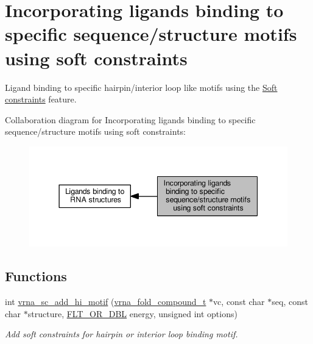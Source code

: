 \hypertarget{group__constraints__ligand}{}\section{Incorporating ligands binding to specific sequence/structure motifs using soft constraints}
\label{group__constraints__ligand}


Ligand binding to specific hairpin/interior loop like motifs using the \hyperlink{group__soft__constraints}{Soft constraints} feature.  


Collaboration diagram for Incorporating ligands binding to specific sequence/structure motifs using soft constraints\+:
\nopagebreak
\begin{figure}[H]
\begin{center}
\leavevmode
\includegraphics[width=344pt]{group__constraints__ligand}
\end{center}
\end{figure}
\subsection*{Functions}
\begin{DoxyCompactItemize}
\item 
int \hyperlink{group__constraints__ligand_gaa6ff0113a3a76dc0b8d62961f4e1dfa0}{vrna\+\_\+sc\+\_\+add\+\_\+hi\+\_\+motif} (\hyperlink{group__fold__compound_ga1b0cef17fd40466cef5968eaeeff6166}{vrna\+\_\+fold\+\_\+compound\+\_\+t} $\ast$vc, const char $\ast$seq, const char $\ast$structure, \hyperlink{group__data__structures_ga31125aeace516926bf7f251f759b6126}{F\+L\+T\+\_\+\+O\+R\+\_\+\+D\+BL} energy, unsigned int options)
\begin{DoxyCompactList}\small\item\em Add soft constraints for hairpin or interior loop binding motif. \end{DoxyCompactList}\end{DoxyCompactItemize}


